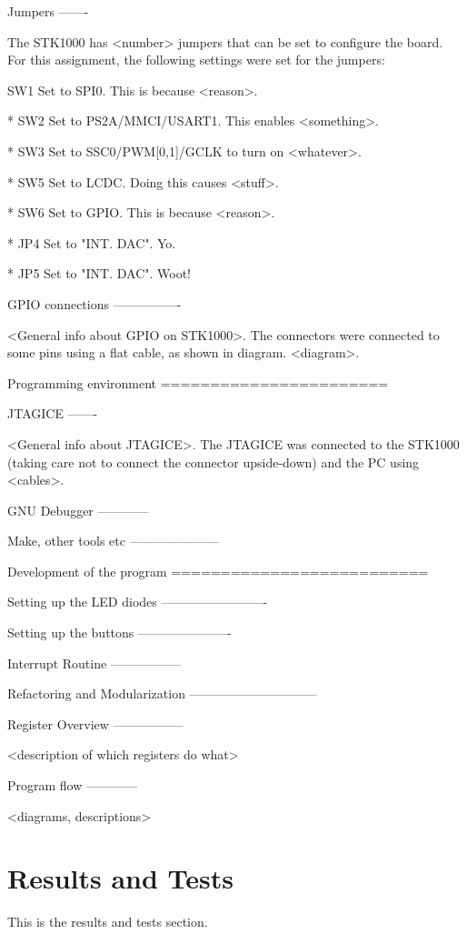 \documentclass{article}
\begin{document}
Jumpers
------- 

The STK1000 has <number> jumpers that can be set to configure the board.
For this assignment, the following settings were set for the jumpers:

SW1
Set to SPI0.
This is because <reason>.


* SW2
Set to PS2A/MMCI/USART1. 
This enables <something>.

* SW3
Set to SSC0/PWM[0,1]/GCLK to turn on <whatever>.

* SW5
Set to LCDC.
Doing this causes <stuff>.

* SW6
Set to GPIO.
This is because <reason>.

* JP4
Set to "INT. DAC". Yo.

* JP5
Set to "INT. DAC". Woot!

GPIO connections
----------------

<General info about GPIO on STK1000>.
The connectors were connected to some pins using a flat cable, as shown in diagram.
<diagram>.


Programming environment
=======================

JTAGICE
-------

<General info about JTAGICE>. The JTAGICE was connected to the STK1000 (taking care not to connect the connector upside-down) and the PC using <cables>.

GNU Debugger
------------

Make, other tools etc
---------------------

Development of the program
==========================

Setting up the LED diodes
-------------------------

Setting up the buttons
----------------------

Interrupt Routine
-----------------

Refactoring and Modularization
------------------------------

Register Overview
-----------------

<description of which registers do what>

Program flow
------------

<diagrams, descriptions>


\part{Results and Tests}

This is the results and tests section.
\end{document}
